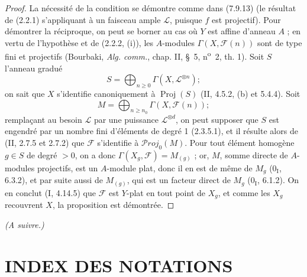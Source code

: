 \begin{proof}
La nécessité de la condition se démontre comme dans (7.9.13) (le résultat de
(2.2.1) s'appliquant à un faisceau ample $\mathscr L$, puisque $f$ est
projectif). Pour démontrer la réciproque, on peut se borner au cas où $Y$ est
affine d'anneau $A$ ; en vertu de l'hypothèse et de (2.2.2, (i)), les
$A$-modules $\Gamma(X,\mathscr F(n))$ sont de type fini et projectifs (Bourbaki,
\emph{Alg. comm.}, chap. II, \S~5, n\textsuperscript{o}~2, th. 1). Soit $S$
l'anneau gradué
\[
  S=\bigoplus_{n\geq0}\Gamma(X,\mathscr L^{\otimes n}) ;
\]
on sait que $X$ s'identifie canoniquement à $\operatorname{Proj}(S)$ (II,
4.5.2, (b) et 5.4.4). Soit
\[
  M=\bigoplus_{n\geq n_0}\Gamma(X,\mathscr F(n)) ;
\]
remplaçant au besoin $\mathscr L$ par une puissance $\mathscr L^{\otimes d}$,
on peut supposer que $S$ est engendré par un nombre fini d'éléments de degré 1
(2.3.5.1), et il résulte alors de (II, 2.7.5 et 2.7.2) que $\mathscr F$
s'identifie à $\mathscr P\!roj_0(M)$. Pour tout élément homogène $g\in S$ de
degré $>0$, on a donc $\Gamma(X_g,\mathscr F)=M_{(g)}$ ; or, $M$, somme directe
de $A$-modules projectifs, est un $A$-module plat, donc il en est de même de
$M_g$ ($0_{\mathrm I}$, 6.3.2), et par suite aussi de $M_{(g)}$, qui est un
facteur direct de $M_g$ ($0_{\mathrm I}$, 6.1.2). On en conclut (I, 4.14.5) que
$\mathscr F$ est $Y$-plat en tout point de $X_g$, et comme les $X_g$ recouvrent
$X$, la proposition est démontrée.
\end{proof}

\bigskip
\noindent\emph{(A suivre.)}

\clearpage
{}
\section*{INDEX DES NOTATIONS}

